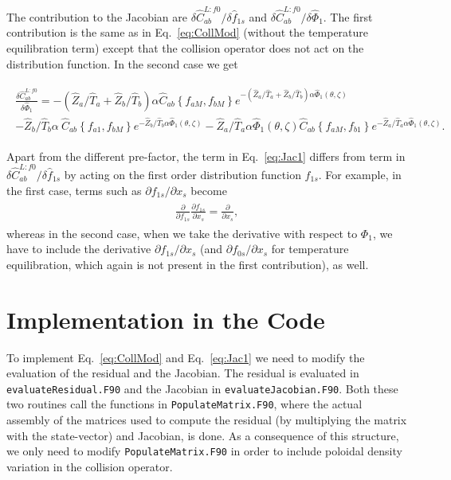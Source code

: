 \documentclass[12pt]{article}
\newcommand{\eq}[1]{\begin{align*}\begin{gathered}#1\end{gathered}\end{align*}}
\newcommand{\eqre}[1]{\begin{align}\begin{gathered}#1\end{gathered}\end{align}}
\begin{document}
The contribution to the Jacobian are $\delta \hat C_{ab}^{L:f0}/\delta \hat f_{1s}$ and $\delta \hat C_{ab}^{L:f0}/\delta\hat \Phi_1$. The first contribution is the same as in Eq.~\eqref{eq:CollMod} (without the temperature equilibration term) except that the collision operator does not act on the distribution function. In the second case we get 

\eqre{
\label{eq:Jac1}
\frac{\delta \hat C_{ab}^{L:f0}}{\delta \hat \Phi_1} = -\left(\hat Z_a/\hat T_a + \hat Z_b/\hat T_b\right) \alpha \hat C_{ab}\left\{f_{aM},f_{bM}\right\}e^{-\left(\hat Z_a/\hat T_a + \hat Z_b/\hat T_b\right) \alpha\hat\Phi_1(\theta,\zeta)}  \\ -\hat Z_b/\hat T_b \alpha\ \hat C_{ab}\left\{f_{a1},f_{bM}\right\}e^{-\hat Z_b/\hat T_b \alpha\hat\Phi_1(\theta,\zeta)}  - \hat Z_a/\hat T_a\alpha\hat\Phi_1(\theta,\zeta) \hat C_{ab}\left\{f_{aM},f_{b1}\right\}e^{-\hat Z_a/\hat T_a\alpha\hat\Phi_1(\theta,\zeta)}.
}

\noindent
Apart from the different pre-factor, the term in Eq.~\eqref{eq:Jac1} differs from term in $\delta \hat C_{ab}^{L:f0}/\delta \hat f_{1s}$ by acting on the first order distribution function $f_{1s}$. For example, in the first case, terms such as $\partial f_{1s}/\partial x_s$ become 
\eq{
\frac{\partial}{\partial f_{1s}}\frac{\partial f_{1s}}{\partial x_s} = \frac{\partial}{\partial x_s},
}
whereas in the second case, when we take the derivative with respect to $\Phi_1$, we have to include the derivative $\partial f_{1s}/\partial x_s$ (and $\partial f_{0s}/\partial x_s$ for temperature equilibration, which again is not present in the first contribution), as well.


\section*{Implementation in the Code}
To implement Eq.~\eqref{eq:CollMod} and Eq.~\eqref{eq:Jac1} we need to modify the evaluation of the residual and the Jacobian. The residual is evaluated in \texttt{evaluateResidual.F90} and the Jacobian in \texttt{evaluateJacobian.F90}. Both these two routines call the functions in \texttt{PopulateMatrix.F90}, where the actual assembly of the matrices used to compute the residual (by multiplying the matrix with the state-vector) and Jacobian, is done. As a consequence of this structure, we only need to modify \texttt{PopulateMatrix.F90} in order to include poloidal density variation in the collision operator.
\end{document}
